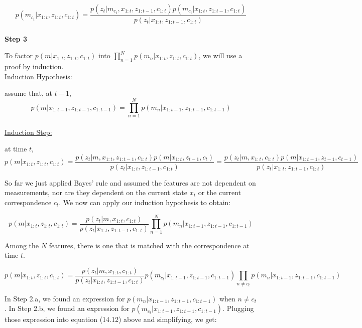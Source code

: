 \documentclass[twoside]{article}
\begin{document}
\begin{equation}
p(m_{c_t}|x_{1:t},z_{1:t},c_{1:t}) = \frac{p(z_t|m_{c_t}, x_{1:t},z_{1:t-1},c_{1:t})p(m_{c_t}|x_{1:t},z_{1:t-1},c_{1:t})}{p(z_t|x_{1:t},z_{1:t-1},c_{1:t})}
\end{equation}
\\

\textbf{Step 3}

To factor $p(m|x_{1:t},z_{1:t},c_{1:t})$ into $\prod_{n=1}^Np(m_n|x_{1:t},z_{1:t},c_{1:t})\nonumber$, we will use a proof by induction.
\\

\underline{Induction Hypothesis:}

assume that, at $t-1$,
\begin{equation}
p(m|x_{1:t-1},z_{1:t-1},c_{1:t-1}) = \prod_{n=1}^Np(m_n|x_{1:t-1},z_{1:t-1},c_{1:t-1})\nonumber
\end{equation}
\\

\underline{Induction Step:}

at time $t$,
\begin{equation}
p(m|x_{1:t},z_{1:t},c_{1:t}) = \frac{p(z_t|m,x_{1:t},z_{1:t-1},c_{1:t})p(m|x_{1:t},z_{t-1}, c_{t})}{p(z_t|x_{1:t},z_{1:t-1},c_{1:t})}
= \frac{p(z_t|m,x_{1:t},c_{1:t})p(m|x_{1:t-1},z_{t-1}, c_{t-1})}{p(z_t|x_{1:t},z_{1:t-1},c_{1:t})}
\end{equation}

So far we just applied Bayes' rule and assumed the features are not dependent on measurements, nor are they dependent on the current state $x_t$ or the current correspondence $c_t$. We now can apply our induction hypothesis to obtain:

\begin{equation}
p(m|x_{1:t},z_{1:t},c_{1:t}) = \frac{p(z_t|m,x_{1:t},c_{1:t})}{p(z_t|x_{1:t},z_{1:t-1},c_{1:t})}\prod_{n=1}^Np(m_n|x_{1:t-1},z_{1:t-1},c_{1:t-1})\nonumber
\end{equation}

Among the $N$ features, there is one that is matched with the correspondence at time $t$.

\begin{equation}
p(m|x_{1:t},z_{1:t},c_{1:t}) = \frac{p(z_t|m,x_{1:t},c_{1:t})}{p(z_t|x_{1:t},z_{1:t-1},c_{1:t})} p(m_{c_t}|x_{1:t-1},z_{1:t-1},c_{1:t-1})\prod_{n\neq c_t}p(m_n|x_{1:t-1},z_{1:t-1},c_{1:t-1})\nonumber
\end{equation}

In Step 2.a, we found an expression for $p(m_n|x_{1:t-1},z_{1:t-1},c_{1:t-1})$ when $n \neq c_t$. In Step 2.b, we found an expression for $p(m_{c_t}|x_{1:t-1},z_{1:t-1},c_{1:t-1})$. Plugging those expression into equation (14.12) above and simplifying, we get:
\end{document}
